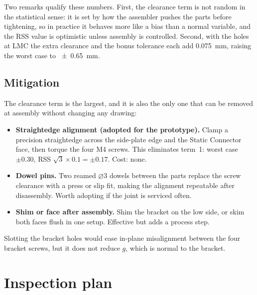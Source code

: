 \documentclass[11pt,letterpaper]{article}
\newcommand{\dia}{$\varnothing$}
\begin{document}
\noindent
Two remarks qualify these numbers. First, the clearance term is not random in the statistical
sense: it is set by how the assembler pushes the parts before tightening, so in practice it
behaves more like a bias than a normal variable, and the RSS value is optimistic unless
assembly is controlled. Second, with the holes at LMC the extra clearance and the bonus
tolerance each add \SI{0.075}{mm}, raising the worst case to \SI{\pm0.65}{mm}.

\subsection{Mitigation}

The clearance term is the largest, and it is also the only one that can be removed at
assembly without changing any drawing:

\begin{itemize}
  \item \textbf{Straightedge alignment (adopted for the prototype).} Clamp a precision
        straightedge across the side-plate edge and the Static Connector face, then torque the
        four M4 screws. This eliminates term~1: worst case $\pm0.30$, RSS
        $\sqrt{3}\times0.1 = \pm0.17$. Cost: none.
  \item \textbf{Dowel pins.} Two reamed \dia3 dowels between the parts replace the screw
        clearance with a press or slip fit, making the alignment repeatable after disassembly.
        Worth adopting if the joint is serviced often.
  \item \textbf{Shim or face after assembly.} Shim the bracket on the low side, or skim both
        faces flush in one setup. Effective but adds a process step.
\end{itemize}

Slotting the bracket holes would ease in-plane misalignment between the four bracket screws,
but it does not reduce $g$, which is normal to the bracket.

\section{Inspection plan}
\label{sec:inspection}
\end{document}
